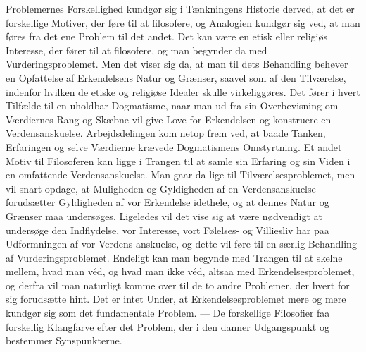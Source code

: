 \documentclass[12pt,a4paper]{book}
\newcommand{\opage}[1]{\marginnote{\footnotesize\textit{[#1]}}}
\begin{document}
Problemernes Forskellighed kundgør sig i Tænkningens Historie derved, at det er
forskellige Motiver, der føre til at filosofere, og Analogien kundgør sig ved, at
man føres fra det ene Problem til det andet. Det kan være en etisk eller religiøs
Interesse, der fører til at filosofere, og man begynder da med Vurderingsproblemet.
Men det viser sig da, at man til dets Behandling behøver en Opfattelse af
Erkendelsens Natur og Grænser, saavel som af den Tilværelse, indenfor hvilken de
etiske og religiøse Idealer skulle virkeliggøres. Det fører i hvert Tilfælde til en
uholdbar Dogmatisme, naar man ud fra sin Overbevisning om Værdiernes Rang og
Skæbne vil give Love for Erkendelsen og konstruere en Verdensanskuelse.
Arbejdsdelingen kom netop frem ved, at baade Tanken, Erfaringen og selve Værdierne
krævede Dogmatismens Omstyrtning. Et andet Motiv til Filosoferen kan ligge i
Trangen til at samle sin Erfaring og sin Viden i en omfattende Verdensanskuelse.
Man gaar da lige til Tilværelsesproblemet, men vil snart opdage, at Muligheden og
Gyldigheden af en Verdensanskuelse forudsætter Gyldigheden af vor Erkendelse
idethele, og at dennes Natur og Grænser maa undersøges. Ligeledes vil det vise sig
at være nødvendigt at undersøge den Indflydelse, vor Interesse, vort Følelses- og
Villiesliv har paa Udformningen af vor Verdens%
\opage{253}anskuelse, og dette vil føre til en
særlig Behandling af Vurderingsproblemet. Endeligt kan man begynde med Trangen til
at skelne mellem, hvad man véd, og hvad man ikke véd, altsaa med
Erkendelsesproblemet, og derfra vil man naturligt komme over til de to andre
Problemer, der hvert for sig forudsætte hint. Det er intet Under, at
Erkendelsesproblemet mere og mere kundgør sig som det fundamentale Problem. --- De
forskellige Filosofier faa forskellig Klangfarve efter det Problem, der i den
danner Udgangspunkt og bestemmer Synspunkterne.
\end{document}
